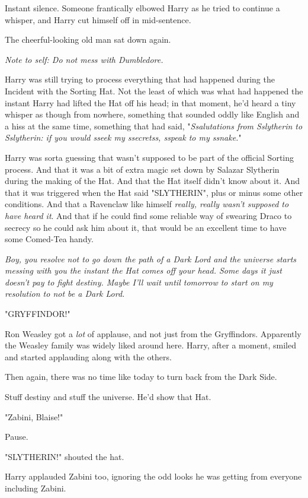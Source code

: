 Instant silence. Someone frantically elbowed Harry as he tried to continue a 
whisper, and Harry cut himself off in mid-sentence.

The cheerful-looking old man sat down again.

\emph{Note to self: Do not mess with Dumbledore.}

Harry was still trying to process everything that had happened during the 
Incident with the Sorting Hat. Not the least of which was what had happened the 
instant Harry had lifted the Hat off his head; in that moment, he'd heard a 
tiny whisper as though from nowhere, something that sounded oddly like English 
and a hiss at the same time, something that had said, "\emph{Ssalutations from 
Sslytherin to Sslytherin: if you would sseek my ssecretss, sspeak to my 
ssnake.}"

Harry was sorta guessing that wasn't supposed to be part of the official 
Sorting process. And that it was a bit of extra magic set down by Salazar 
Slytherin during the making of the Hat. And that the Hat itself didn't know 
about it. And that it was triggered when the Hat said "SLYTHERIN", plus or 
minus some other conditions. And that a Ravenclaw like himself \emph{really, 
really wasn't supposed to have heard it}. And that if he could find some 
reliable way of swearing Draco to secrecy so he could ask him about it, that 
would be an excellent time to have some Comed-Tea handy.

\emph{Boy, you resolve not to go down the path of a Dark Lord and the universe 
starts messing with you the instant the Hat comes off your head. Some days it 
just doesn't pay to fight destiny. Maybe I'll wait until tomorrow to start on 
my resolution to not be a Dark Lord.}

"GRYFFINDOR!"

Ron Weasley got a \emph{lot} of applause, and not just from the Gryffindors. 
Apparently the Weasley family was widely liked around here. Harry, after a 
moment, smiled and started applauding along with the others.

Then again, there was no time like today to turn back from the Dark Side.

Stuff destiny and stuff the universe. He'd show that Hat.

"Zabini, Blaise!"

Pause.

"SLYTHERIN!" shouted the hat.

Harry applauded Zabini too, ignoring the odd looks he was getting from everyone 
including Zabini.

